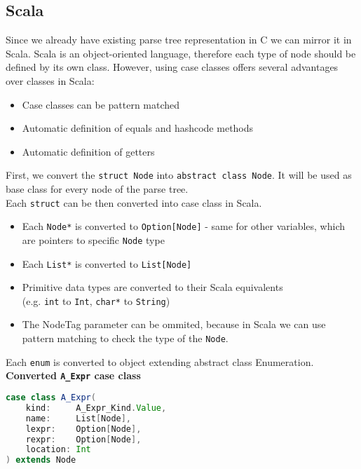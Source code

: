 \subsection{Scala}
Since we already have existing parse tree representation in C we can mirror it in Scala.
Scala is an object-oriented language, therefore each type of node should be defined by its own class. However, using case classes offers several advantages over classes in Scala: 
\begin{itemize}
    \item Case classes can be pattern matched
    \item Automatic definition of equals and hashcode methods
    \item Automatic definition of getters
\end{itemize}
First, we convert the \texttt{struct Node} into \texttt{abstract class Node}. It will be used as base class for every node of the parse tree. \\
Each \texttt{struct} can be then converted into case class in Scala. 
\begin{itemize}
    \item Each \texttt{Node*} is converted to \texttt{Option[Node]} - same for other variables, which are pointers to specific \texttt{Node} type
    \item Each \texttt{List*} is converted to \texttt{List[Node]}
    \item Primitive data types are converted to their Scala equivalents \\
    (e.g. \texttt{int} to \texttt{Int}, \texttt{char*} to \texttt{String})
    \item The NodeTag parameter can be ommited, because in Scala we can use pattern matching to check the type of the \texttt{Node}.
\end{itemize}
Each \texttt{enum} is converted to object extending abstract class Enumeration.
 \\
\textbf{Converted \texttt{A\_Expr} case class}
\begin{lstlisting}[language=scala, basicstyle=\ttfamily]
case class A_Expr(
    kind:     A_Expr_Kind.Value,
    name:     List[Node],
    lexpr:    Option[Node],
    rexpr:    Option[Node],
    location: Int
) extends Node
\end{lstlisting}